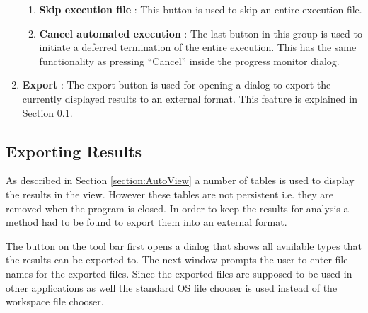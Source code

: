 \begin{enumerate}
\begin{enumerate}
 \item \textbf{Skip execution file} : This button is used to skip an entire execution file.
 \item \textbf{Cancel automated execution} : The last button in this group is used to initiate a deferred
termination of the entire execution. This has the same functionality as pressing ``Cancel'' inside the 
progress monitor dialog.
\end{enumerate}
 \item \textbf{Export} : The export button is used for opening a dialog to export the currently displayed
results to an external format. This feature is explained in Section \ref{section:AutoExportResults}.
\end{enumerate}

\subsection{Exporting Results}
\label{section:AutoExportResults}
As described in Section \ref{section:AutoView} a number of tables is used to display the results in the view.
However these tables are not persistent i.e. they are removed when the program is closed.
In order to keep the results for analysis a method had to be found to export them into
an external format.

The button on the tool bar first opens a dialog that shows all available types that the results can
be exported to. The next window prompts the user to enter file names for the exported files.
Since the exported files are supposed to be used in other applications as well the standard 
\ac{OS} file chooser is used instead of the workspace file chooser.

